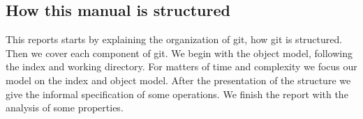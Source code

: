 \subsection{How this manual is structured}
This reports starts by explaining the organization of git, how git is
structured. Then we cover each component of git. We begin with the
object model, following the index and working directory. For matters
of time and complexity we focus our model on the index and object
model. After the presentation of the structure we give the informal
specification of some operations. We finish the report with the
analysis of some properties.


